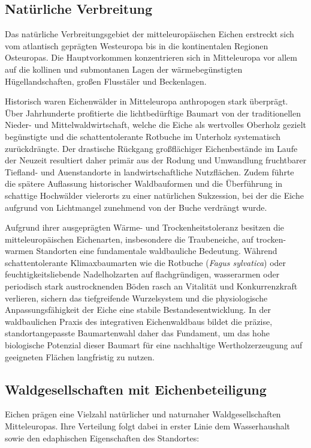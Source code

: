 \documentclass[twocolumn, bibliography=totoc, abstract=true]{scrartcl}
\begin{document}
\subsection{Natürliche Verbreitung}

Das natürliche Verbreitungsgebiet der mitteleuropäischen Eichen erstreckt sich vom atlantisch geprägten Westeuropa bis in die kontinentalen Regionen Osteuropas. Die Hauptvorkommen konzentrieren sich in Mitteleuropa vor allem auf die kollinen und submontanen Lagen der wärmebegünstigten Hügellandschaften, großen Flusstäler und Beckenlagen. 

Historisch waren Eichenwälder in Mitteleuropa anthropogen stark überprägt. Über Jahrhunderte profitierte die lichtbedürftige Baumart von der traditionellen Nieder- und Mittelwaldwirtschaft, welche die Eiche als wertvolles Oberholz gezielt begünstigte und die schattentolerante Rotbuche im Unterholz systematisch zurückdrängte. Der drastische Rückgang großflächiger Eichenbestände im Laufe der Neuzeit resultiert daher primär aus der Rodung und Umwandlung fruchtbarer Tiefland- und Auenstandorte in landwirtschaftliche Nutzflächen. Zudem führte die spätere Auflassung historischer Waldbauformen und die Überführung in schattige Hochwälder vielerorts zu einer natürlichen Sukzession, bei der die Eiche aufgrund von Lichtmangel zunehmend von der Buche verdrängt wurde.

Aufgrund ihrer ausgeprägten Wärme- und Trockenheitstoleranz besitzen die mitteleuropäischen Eichenarten, insbesondere die Traubeneiche, auf trocken-warmen Standorten eine fundamentale waldbauliche Bedeutung. Während schattentolerante Klimaxbaumarten wie die Rotbuche (\textit{Fagus sylvatica}) oder feuchtigkeitsliebende Nadelholzarten auf flachgründigen, wasserarmen oder periodisch stark austrocknenden Böden rasch an Vitalität und Konkurrenzkraft verlieren, sichern das tiefgreifende Wurzelsystem und die physiologische Anpassungsfähigkeit der Eiche eine stabile Bestandesentwicklung. In der waldbaulichen Praxis des integrativen Eichenwaldbaus bildet die präzise, standortangepasste Baumartenwahl daher das Fundament, um das hohe biologische Potenzial dieser Baumart für eine nachhaltige Wertholzerzeugung auf geeigneten Flächen langfristig zu nutzen.

\subsection{Waldgesellschaften mit Eichenbeteiligung}

Eichen prägen eine Vielzahl natürlicher und naturnaher Waldgesellschaften Mitteleuropas. Ihre Verteilung folgt dabei in erster Linie dem Wasserhaushalt sowie den edaphischen Eigenschaften des Standortes:
\end{document}
